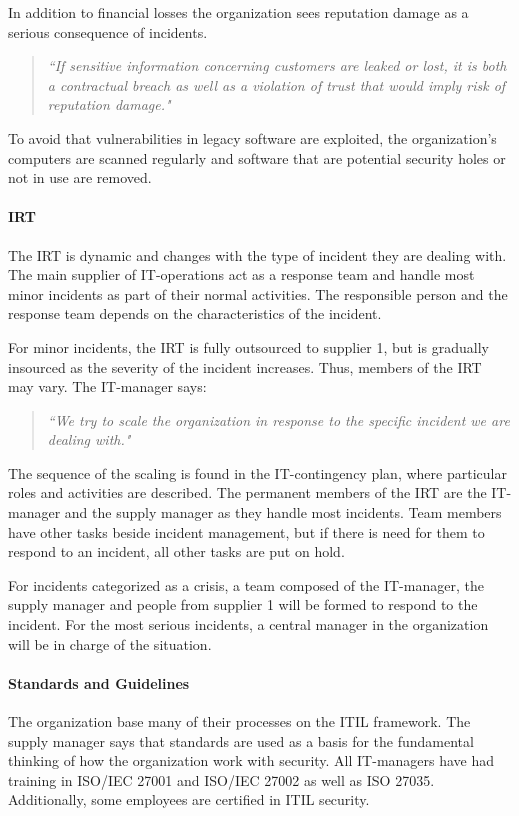 In addition to financial losses the organization sees reputation damage as a serious consequence of incidents. 
\begin{quote}
\textit{``If sensitive information concerning customers are leaked or lost, it is both a contractual breach as well as a violation of trust that would imply risk of reputation damage."}
\end{quote}

To avoid that vulnerabilities in legacy software are exploited, the organization's computers are scanned regularly and software that are potential security holes or not in use are removed. 

\paragraph{\acl{IRT}}
The \ac{IRT} is dynamic and changes with the type of incident they are dealing with. The main supplier of IT-operations act as a response team and handle most minor incidents as part of their normal activities. The responsible person and the response team depends on the characteristics of the incident.   

For minor incidents, the \ac{IRT} is fully outsourced to supplier 1, but is gradually insourced as the severity of the incident increases. Thus, members of the \ac{IRT} may vary. The IT-manager says:
\begin{quote}
\textit{``We try to scale the organization in response to the specific incident we are dealing with."}
\end{quote}

The sequence of the scaling is found in the IT-contingency plan, where particular roles and activities are described. The permanent members of the \ac{IRT} are the IT-manager and the supply manager as they handle most incidents. Team members have other tasks beside incident management, but if there is need for them to respond to an incident, all other tasks are put on hold.

For incidents categorized as a crisis, a team composed of the IT-manager, the supply manager and people from supplier 1 will be formed to respond to the incident. For the most serious incidents, a central manager in the organization will be in charge of the situation.

\paragraph{Standards and Guidelines}
The organization base many of their processes on the ITIL framework. The supply manager says that standards are used as a basis for the fundamental thinking of how the organization work with security. All IT-managers have had training in ISO/IEC 27001 and ISO/IEC 27002 as well as ISO 27035. Additionally, some employees are certified in ITIL security.   

